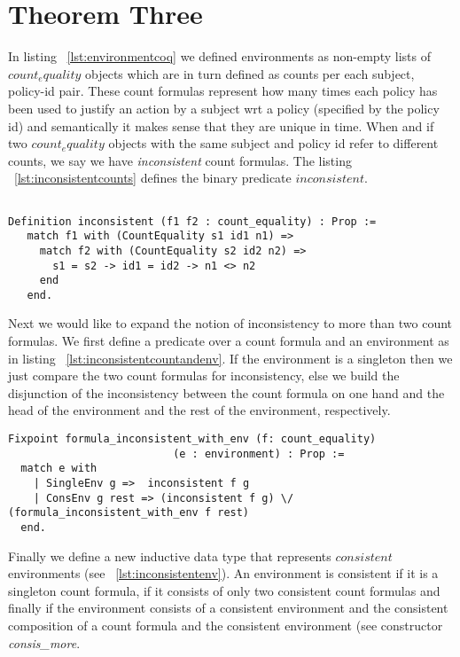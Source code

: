 \section{Theorem Three}

In listing ~\ref{lst:environmentcoq} we defined environments as non-empty lists of $count_equality$ objects which are in turn defined as counts per each subject, policy-id pair. These count formulas represent how many times each policy has been used to justify an action by a subject wrt a policy (specified by the policy id) and semantically it makes sense that they are unique in time. When and if two $count_equality$ objects with the same subject and policy id refer to different counts, we say we have \emph{inconsistent} count formulas. The listing ~\ref{lst:inconsistentcounts} defines the binary predicate $inconsistent$.

\lstset{language=Coq}
\begin{lstlisting}[frame=single, caption={Inconsistent Count Formulas}, label={lst:inconsistentcounts}]

Definition inconsistent (f1 f2 : count_equality) : Prop :=
   match f1 with (CountEquality s1 id1 n1) =>
     match f2 with (CountEquality s2 id2 n2) =>       
       s1 = s2 -> id1 = id2 -> n1 <> n2
     end 
   end.

\end{lstlisting}


Next we would like to expand the notion of inconsistency to more than two count formulas. We first define a predicate over a count formula and an environment as in listing ~\ref{lst:inconsistentcountandenv}. If the environment is a singleton then we just compare the two count formulas for inconsistency, else we build the disjunction of the inconsistency between the count formula on one hand and the head of the environment and the rest of the environment, respectively. 

\lstset{language=Coq}
\begin{lstlisting}[frame=single, caption={Inconsistent Count Formula And Environment}, label={lst:inconsistentcountandenv}]
Fixpoint formula_inconsistent_with_env (f: count_equality)
                          (e : environment) : Prop :=
  match e with
    | SingleEnv g =>  inconsistent f g
    | ConsEnv g rest => (inconsistent f g) \/ (formula_inconsistent_with_env f rest)
  end.
\end{lstlisting}

Finally we define a new inductive data type that represents $consistent$ environments (see ~\ref{lst:inconsistentenv}). An environment is consistent if it is a singleton count formula, if it consists of only two consistent count formulas and finally if the environment consists of a consistent environment and the consistent  composition of a count formula and the consistent environment (see constructor \emph{consis_more}.

